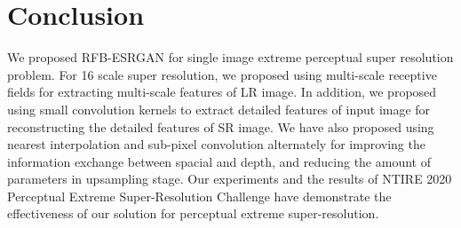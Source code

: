 \documentclass[10pt,twocolumn,letterpaper]{article}
\begin{document}
\section{Conclusion}
We proposed RFB-ESRGAN for single image extreme perceptual super resolution problem. For 16 scale super resolution, we proposed using multi-scale receptive fields for extracting multi-scale features of LR image. In addition, we proposed using small convolution kernels to extract detailed features of input image for reconstructing the detailed features of SR image. We have also proposed using nearest interpolation and sub-pixel convolution alternately for improving the information exchange between spacial and depth, and reducing the amount of parameters in upsampling stage. Our experiments and the results of NTIRE 2020 Perceptual Extreme Super-Resolution Challenge have demonstrate the effectiveness of our solution for perceptual extreme super-resolution.


{\small


}
\end{document}
